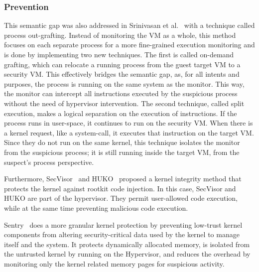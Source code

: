 \subsubsection{Prevention}

\par This semantic gap was also addressed in Srinivasan et al.~\cite{srinivasan2011process} with a technique called process out-grafting. Instead of monitoring the \ac{VM} as a whole, this method focuses on each separate process for a more fine-grained execution monitoring and is done by implementing two new techniques. The first is called on-demand grafting, which can relocate a running process from the guest target \ac{VM} to a security \ac{VM}. This effectively bridges the semantic gap, as, for all intents and purposes, the process is running on the same system as the monitor. This way, the monitor can intercept all instructions executed by the suspicious process without the need of hypervisor intervention. The second technique, called split execution, makes a logical separation on the execution of instructions. If the process runs in user-space, it continues to run on the security \ac{VM}. When there is a kernel request, like a system-call, it executes that instruction on the target \ac{VM}. Since they do not run on the same kernel, this technique isolates the monitor from the suspicious process; it is still running inside the target \ac{VM}, from the suspect’s process perspective. 

\par Furthermore, SecVisor~\cite{seshadri2007secvisor} and HUKO~\cite{xiong2011practical} proposed a kernel integrity method that protects the kernel against rootkit code injection. In this case, SecVisor and HUKO are part of the hypervisor. They permit user-allowed code execution, while at the same time preventing malicious code execution.


\par Sentry~\cite{srivastava2012efficient} does a more granular kernel protection by preventing low-trust kernel components from altering security-critical data used by the kernel to manage itself and the system. It protects dynamically allocated memory, is isolated from the untrusted kernel by running on the Hypervisor, and reduces the overhead by monitoring only the kernel related memory pages for suspicious activity.


